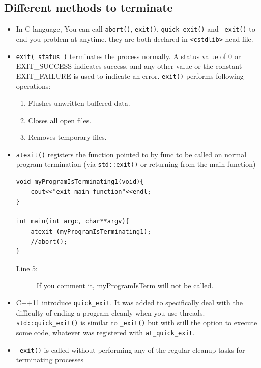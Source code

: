 \documentclass[a4paper,11pt,twoside]{book}
\begin{document}
\subsection{Different methods to terminate}
\begin{itemize}
	\item In C language, You can call \texttt{abort()}, \texttt{exit()}, \texttt{quick\_exit()} and  \texttt{\_exit()} to end you problem at anytime. they are both declared in \texttt{<cstdlib>} head file.
	
	\item \texttt{exit( status )} terminates the process normally. A status value of 0 or EXIT\_SUCCESS indicates success, and any other value or the constant EXIT\_FAILURE is used to indicate an error. \texttt{exit()} performs following operations:
	\begin{enumerate}
		\item Flushes unwritten buffered data.
		\item Closes all open files.
		\item Removes temporary files.
	\end{enumerate}
	
	\item \texttt{atexit()} registers the function pointed to by func to be called on normal program termination (via \texttt{std::exit()} or returning from the main function)
\begin{lstlisting}[numbers=none]
void myProgramIsTerminating1(void){
	cout<<"exit main function"<<endl;
}
	
int main(int argc, char**argv){
	atexit (myProgramIsTerminating1);
	//abort(); 
}
\end{lstlisting}
\begin{description}
	\item[Line 5:] If you comment it, myProgramIsTerm will not be called.
\end{description}
	

	\item C++11 introduce \texttt{quick\_exit}. It was added to specifically deal with the difficulty of ending a program cleanly when you use threads. \texttt{std::quick\_exit()} is similar to \texttt{\_exit()} but with still the option to execute some code, whatever was registered with \texttt{at\_quick\_exit}.
	
	\item \texttt{\_exit()} is called without performing any of the regular cleanup tasks for terminating processes
	

\end{itemize}
\end{document}
